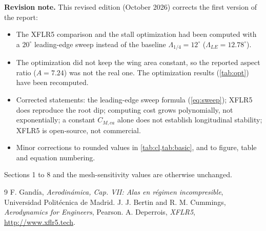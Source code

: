 \documentclass[11pt,letterpaper]{article}
\begin{document}
\textbf{Revision note.} This revised edition (October 2026) corrects the first version of the
report:
\begin{itemize}
  \item The XFLR5 comparison and the stall optimization had been computed with a $20^\circ$
  leading-edge sweep instead of the baseline $\Lambda_{1/4} = 12^\circ$ ($\Lambda_{LE} = 12.78^\circ$).
  \item The optimization did not keep the wing area constant, so the reported aspect ratio
  ($A = 7.24$) was not the real one. The optimization results (\cref{tab:opt}) have been recomputed.
  \item Corrected statements: the leading-edge sweep formula (\cref{eq:sweep}); XFLR5 does reproduce
  the root dip; computing cost grows polynomially, not exponentially; a constant $C_{M,ca}$ alone does
  not establish longitudinal stability; XFLR5 is open-source, not commercial.
  \item Minor corrections to rounded values in \cref{tab:cl,tab:basic}, and to figure, table and
  equation numbering.
\end{itemize}
Sections 1 to 8 and the mesh-sensitivity values are otherwise unchanged.

\begin{thebibliography}{9}
   F. Gandía, \textit{Aerodinámica, Cap. VII: Alas en régimen incompresible},
  Universidad Politécnica de Madrid.
   J. J. Bertin and R. M. Cummings, \textit{Aerodynamics for Engineers}, Pearson.
   A. Deperrois, \textit{XFLR5}, \url{http://www.xflr5.tech}.
\end{thebibliography}
\end{document}
